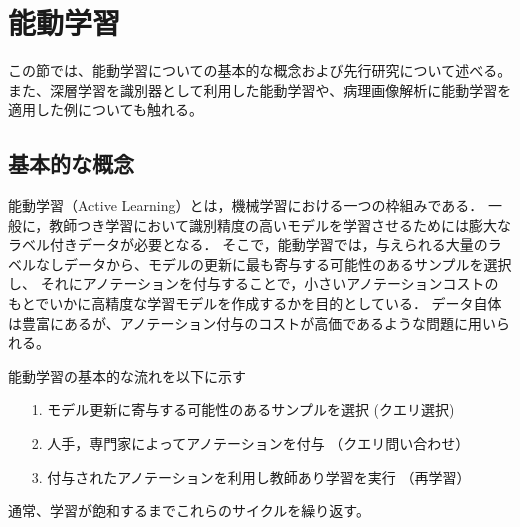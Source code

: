 \section{能動学習}

この節では、能動学習についての基本的な概念および先行研究について述べる。
また、深層学習を識別器として利用した能動学習や、病理画像解析に能動学習を適用した例についても触れる。

\subsection{基本的な概念}
能動学習（Active Learning）\cite{settles2010active}とは，機械学習における一つの枠組みである．
一般に，教師つき学習において識別精度の高いモデルを学習させるためには膨大なラベル付きデータが必要となる．
そこで，能動学習では，与えられる大量のラベルなしデータから、モデルの更新に最も寄与する可能性のあるサンプルを選択し、
それにアノテーションを付与することで，小さいアノテーションコストのもとでいかに高精度な学習モデルを作成するかを目的としている．
データ自体は豊富にあるが、アノテーション付与のコストが高価であるような問題に用いられる。

能動学習の基本的な流れを以下に示す
\begin{itemize}
    \item[1.] モデル更新に寄与する可能性のあるサンプルを選択 (クエリ選択)
    \item[2.] 人手，専門家によってアノテーションを付与 （クエリ問い合わせ）
    \item[3.] 付与されたアノテーションを利用し教師あり学習を実行 （再学習）
\end{itemize}
通常、学習が飽和するまでこれらのサイクルを繰り返す。

